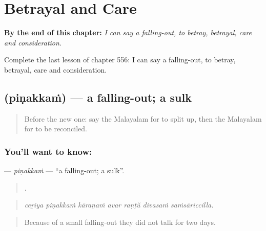 
\chapter{Betrayal and Care}
\label{ch:ml-betrayal-and-care}

\begin{chapteropening}
\textbf{By the end of this chapter:} \emph{I can say a falling-out, to betray, betrayal, care and consideration.}

Complete the last lesson of chapter 556: I can say a falling-out, to betray, betrayal, care and consideration.
\end{chapteropening}

\section[\texorpdfstring{\ml{പിണക്കം} (piṇakkaṁ)}{പിണക്കം (piṇakkaṁ)}]{ (piṇakkaṁ) — a falling-out; a sulk}

\label{lesson:ML-C556-pinakkam}



\begin{quote}
Before the new one: say the Malayalam for to split up, then the Malayalam for to be reconciled.
\end{quote}

\subsection*{You'll want to know: }
\textbf{} — \emph{piṇakkaṁ} — \textquotedblleft{}a falling-out; a sulk\textquotedblright{}.

\begin{quote}
      .
\end{quote}

\begin{quote}
\emph{ceṟiya piṇakkaṁ kāraṇaṁ avar raṇṭŭ divasaṁ saṁsāriccilla.}
\end{quote}

\begin{quote}
Because of a small falling-out they did not talk for two days.
\end{quote}

